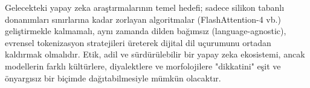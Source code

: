 \documentclass[11pt,a4paper]{article}
\begin{document}
Gelecekteki yapay zeka araştırmalarının temel hedefi; sadece silikon tabanlı donanımları sınırlarına kadar zorlayan algoritmalar (FlashAttention-4 vb.) geliştirmekle kalmamalı, aynı zamanda dilden bağımsız (language-agnostic), evrensel tokenizasyon stratejileri üreterek dijital dil uçurumunu ortadan kaldırmak olmalıdır. Etik, adil ve sürdürülebilir bir yapay zeka ekosistemi, ancak modellerin farklı kültürlere, diyalektlere ve morfolojilere "dikkatini" eşit ve önyargısız bir biçimde dağıtabilmesiyle mümkün olacaktır.
\end{document}
